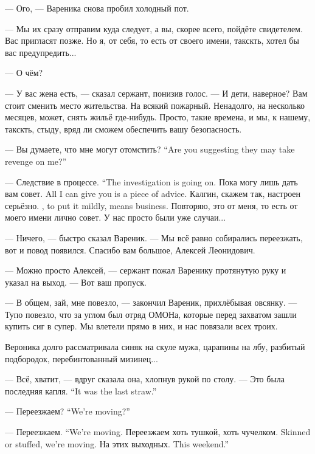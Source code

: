 --- Ого, --- Вареника снова пробил холодный пот.

--- Мы их сразу отправим куда следует, а вы, скорее всего, пойдёте свидетелем.
Вас пригласят позже.
Но я, от себя, то есть от своего имени, такскть, хотел бы вас предупредить...

--- О чём?

--- У вас жена есть, --- сказал сержант, понизив голос.
--- И дети, наверное?
Вам стоит сменить место жительства.
На всякий пожарный.
Ненадолго, на несколько месяцев, может, снять жильё где-нибудь.
Просто, такие времена, и мы, к нашему, такскть, стыду, вряд ли сможем обеспечить вашу безопасность.

{--- Вы думаете, что мне могут отомстить?}
{``Are you suggesting they may take revenge on me?''}

{--- Следствие в процессе.}
{``The investigation is going on.}
{Пока могу лишь дать вам совет.}
{All I can give you is a piece of advice.}
{Калгин, скажем так, настроен серьёзно.}
{\Kalgin, to put it mildly, means business.}
Повторяю, это от меня, то есть от моего имени лично совет.
У нас просто были уже случаи...

--- Ничего, --- быстро сказал Вареник.
--- Мы всё равно собирались переезжать, вот и повод появился.
Спасибо вам большое, Алексей Леонидович.

--- Можно просто Алексей, --- сержант пожал Варенику протянутую руку и указал на выход.
--- Вот ваш пропуск.

\asterism

\textspace

--- В общем, зай, мне повезло, --- закончил Вареник, прихлёбывая овсянку.
--- Тупо повезло, что за углом был отряд ОМОНа, которые перед захватом зашли купить сиг в супер.
Мы влетели прямо в них, и нас повязали всех троих.

Вероника долго рассматривала синяк на скуле мужа, царапины на лбу, разбитый подбородок, перебинтованный мизинец...

--- Всё, хватит, --- вдруг сказала она, хлопнув рукой по столу.
{--- Это была последняя капля.}
{``It was the last straw.''}

{--- Переезжаем?}
{``We're moving?''}

{--- Переезжаем.}
{``We're moving.}
{Переезжаем хоть тушкой, хоть чучелком.}
{Skinned or stuffed, we're moving.}
{На этих выходных.}
{This weekend.''}

\asterism

